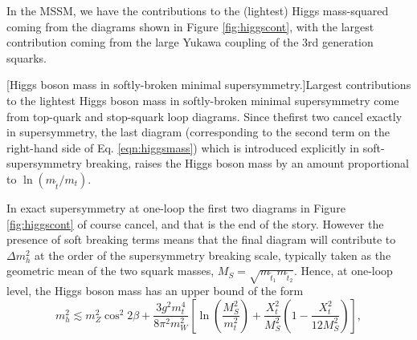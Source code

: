 In the MSSM, we have the contributions to the (lightest) Higgs mass-squared coming from the diagrams shown in Figure \ref{fig:higgscont}, with the largest contribution coming from the large Yukawa coupling of the 3rd generation squarks.
\begin{center}
\vspace{10mm}
[Higgs boson mass in softly-broken minimal supersymmetry.]{Largest contributions to the lightest Higgs boson mass in softly-broken minimal supersymmetry come from top-quark and stop-squark loop diagrams. Since thefirst two cancel exactly in supersymmetry, the last diagram (corresponding to the second term on the right-hand side of Eq. \ref{eqn:higgsmass}) which is introduced explicitly in soft-supersymmetry breaking, raises the Higgs boson mass by an amount proportional to $\ln{(m_{\tilde{t}}/m_{t})}$.}
\label{fig:higgscont}
\end{center}
In exact supersymmetry at one-loop the first two diagrams in Figure \ref{fig:higgscont} of course cancel, and that is the end of the story. However the presence of soft breaking terms means that the final diagram will contribute to $\Delta m^2_h$ at the order of the supersymmetry breaking scale, typically taken as the geometric mean of the two squark masses, $M_{S}=\sqrt{m_{\tilde{t}_1} m_{\tilde{t}_2}}$. Hence, at one-loop level, the Higgs boson mass has an upper bound of the form
\begin{equation}
m^2_{h} \lesssim m^2_{Z}\cos^2{2\beta}+\frac{3g^2m^4_{t}}{8\pi^2m^2_{W}}\left[\ln{\left(\frac{M^2_{S}}{m^2_{t}}\right)}+\frac{X^2_{t}}{M^2_{S}}\left( 1-\frac{X^2_{t}}{12M^2_{S}}\right)\right],
\label{eqn:higgsmass}
\end{equation}
